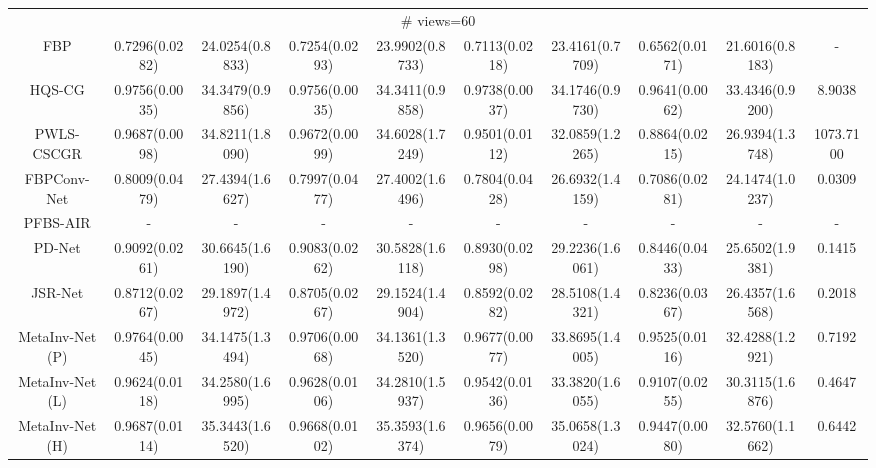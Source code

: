 \documentclass[journal,twoside]{IEEEtran}
\begin{document}
\begin{table*}[ht]
\begin{tabular}{|c|c|c|c|c|c|c|c|c|c|}
  
 \multicolumn{10}{|c|}{\cellcolor{gbygreen}\# views=60} \\
  \cline{1-10}
 FBP
&0.7296(0.0282) &24.0254(0.8833) 
&0.7254(0.0293) &23.9902(0.8733) 
&0.7113(0.0218) &23.4161(0.7709)
&0.6562(0.0171) &21.6016(0.8183) &-\\
  \cline{1-10}
 HQS-CG 
&\cellcolor{gbyblue}0.9756(0.0035) &34.3479(0.9856) 
&\cellcolor{gbypink}0.9756(0.0035) &34.3411(0.9858) 
&\cellcolor{gbypink}0.9738(0.0037) &\cellcolor{gbyblue}34.1746(0.9730) 
&\cellcolor{gbypink}0.9641(0.0062) &\cellcolor{gbypink}33.4346(0.9200) &8.9038\\
  \cline{1-10}
PWLS-CSCGR 
&0.9687(0.0098) &\cellcolor{gbyblue}34.8211(1.8090) 
&0.9672(0.0099) &\cellcolor{gbyblue}34.6028(1.7249) 
&0.9501(0.0112) &32.0859(1.2265) 
&0.8864(0.0215) &26.9394(1.3748) &1073.7100\\
    \cline{1-10}
 FBPConv-Net 
&0.8009(0.0479) &27.4394(1.6627)
&0.7997(0.0477) &27.4002(1.6496)
&0.7804(0.0428) &26.6932(1.4159) 
&0.7086(0.0281) &24.1474(1.0237) &0.0309\\
    \cline{1-10}
 PFBS-AIR 
&- &- &- &- &- &- &- &- &-\\
    \cline{1-10}
 PD-Net 
&0.9092(0.0261) &30.6645(1.6190)
&0.9083(0.0262) &30.5828(1.6118)
&0.8930(0.0298) &29.2236(1.6061) 
&0.8446(0.0433) &25.6502(1.9381) &0.1415\\
  \cline{1-10}
  JSR-Net
&0.8712(0.0267) &29.1897(1.4972) 
&0.8705(0.0267) &29.1524(1.4904) 
&0.8592(0.0282) &28.5108(1.4321) 
&0.8236(0.0367) &26.4357(1.6568) &0.2018\\
  \cline{1-10}
  MetaInv-Net (P)
&\cellcolor{gbypink}0.9764(0.0045) &34.1475(1.3494)
&\cellcolor{gbyblue}0.9706(0.0068) &34.1361(1.3520) 
&\cellcolor{gbyblue}0.9677(0.0077) &33.8695(1.4005) 
&\cellcolor{gbyblue}0.9525(0.0116) &32.4288(1.2921) &0.7192\\
  \cline{1-10}
MetaInv-Net (L)  
&0.9624(0.0118) &34.2580(1.6995) 
&0.9628(0.0106) &34.2810(1.5937) 
&0.9542(0.0136) &33.3820(1.6055) 
&0.9107(0.0255) &30.3115(1.6876) &0.4647\\
  \cline{1-10}
  MetaInv-Net (H) 
&0.9687(0.0114) &\cellcolor{gbypink}35.3443(1.6520) 
&0.9668(0.0102) &\cellcolor{gbypink}35.3593(1.6374) 
&0.9656(0.0079) &\cellcolor{gbypink}35.0658(1.3024) 
&0.9447(0.0080) &\cellcolor{gbyblue}32.5760(1.1662) &0.6442\\
  \cline{1-10}
  


\end{tabular}
\end{table*}
\end{document}
